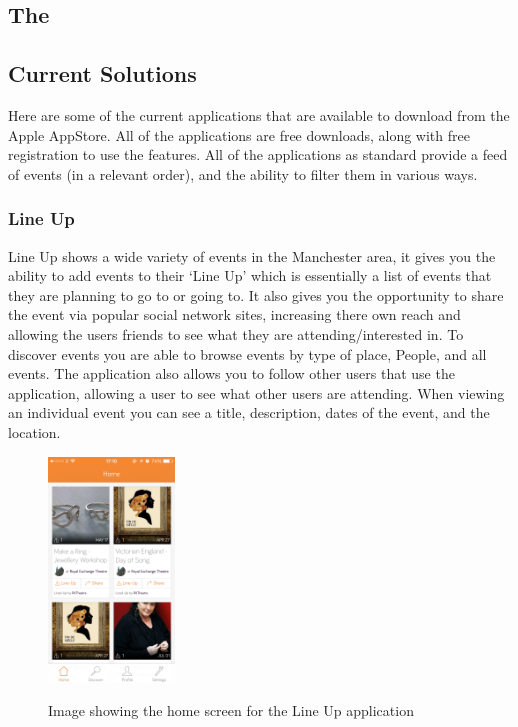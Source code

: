 	\subsection{The }

	\subsection{Current Solutions}
		Here are some of the current applications that are available to download from the Apple AppStore. All of the applications are free downloads, along with free registration to use the features. All of the applications as standard provide a feed of events (in a relevant order), and the ability to filter them in various ways. 

		\subsubsection{Line Up}
			Line Up\cite{lineup} shows a wide variety of events in the Manchester area, it gives you the ability to add events to their `Line Up' which is essentially a list of events that they are planning to go to or going to. It also gives you the opportunity to share the event via popular social network sites, increasing there own reach and allowing the users friends to see what they are attending/interested in. To discover events you are able to browse events by type of place, People, and all events. The application also allows you to follow other users that use the application, allowing a user to see what other users are attending. When viewing an individual event you can see a title, description, dates of the event, and the location. 
			
			\begin{figure}[ht] %
				\caption[Line Up home screen]{Image showing the home screen for the Line Up application }
				\centering
				\includegraphics[width=0.3\textwidth]{Images/lineup}
				\label{fig:lineup}
			\end{figure}

